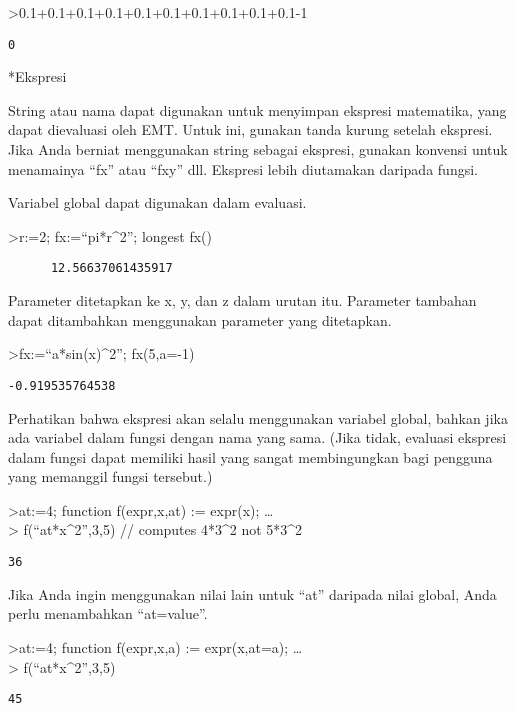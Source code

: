 \documentclass[
]{book}
\begin{document}
\textgreater0.1+0.1+0.1+0.1+0.1+0.1+0.1+0.1+0.1+0.1-1

\begin{verbatim}
0
\end{verbatim}

*Ekspresi

String atau nama dapat digunakan untuk menyimpan ekspresi matematika, yang dapat dievaluasi oleh EMT. Untuk ini, gunakan tanda kurung setelah ekspresi. Jika Anda berniat menggunakan string sebagai ekspresi, gunakan konvensi untuk menamainya ``fx'' atau ``fxy'' dll. Ekspresi lebih diutamakan daripada fungsi.

Variabel global dapat digunakan dalam evaluasi.

\textgreater r:=2; fx:=``pi*r\^{}2''; longest fx()

\begin{verbatim}
      12.56637061435917 
\end{verbatim}

Parameter ditetapkan ke x, y, dan z dalam urutan itu. Parameter tambahan dapat ditambahkan menggunakan parameter yang ditetapkan.

\textgreater fx:=``a*sin(x)\^{}2''; fx(5,a=-1)

\begin{verbatim}
-0.919535764538
\end{verbatim}

Perhatikan bahwa ekspresi akan selalu menggunakan variabel global, bahkan jika ada variabel dalam fungsi dengan nama yang sama. (Jika tidak, evaluasi ekspresi dalam fungsi dapat memiliki hasil yang sangat membingungkan bagi pengguna yang memanggil fungsi tersebut.)

\textgreater at:=4; function f(expr,x,at) := expr(x); \ldots{}\\
\textgreater{} f(``at*x\^{}2'',3,5) // computes 4*3\^{}2 not 5*3\^{}2

\begin{verbatim}
36
\end{verbatim}

Jika Anda ingin menggunakan nilai lain untuk ``at'' daripada nilai global, Anda perlu menambahkan ``at=value''.

\textgreater at:=4; function f(expr,x,a) := expr(x,at=a); \ldots{}\\
\textgreater{} f(``at*x\^{}2'',3,5)

\begin{verbatim}
45
\end{verbatim}
\end{document}
